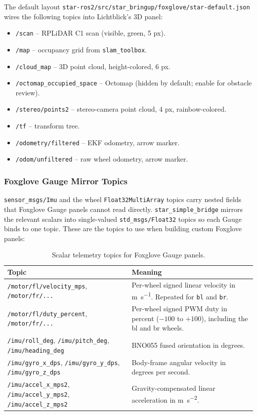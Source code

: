 \documentclass[11pt,letterpaper]{article}
\begin{document}
The default layout
\texttt{star-ros2/src/star\_bringup/foxglove/star-default.json}
wires the following topics into Lichtblick's 3D panel:
\begin{itemize}[leftmargin=1.4em,itemsep=2pt]
\item \texttt{/scan} -- RPLiDAR C1 scan (visible, green, 5 px).
\item \texttt{/map} -- occupancy grid from \texttt{slam\_toolbox}.
\item \texttt{/cloud\_map} -- 3D point cloud, height-colored, 6 px.
\item \texttt{/octomap\_occupied\_space} -- Octomap (hidden by
      default; enable for obstacle review).
\item \texttt{/stereo/points2} -- stereo-camera point cloud, 4 px,
      rainbow-colored.
\item \texttt{/tf} -- transform tree.
\item \texttt{/odometry/filtered} -- EKF odometry, arrow marker.
\item \texttt{/odom/unfiltered} -- raw wheel odometry, arrow marker.
\end{itemize}

\subsubsection*{Foxglove Gauge Mirror Topics}
\texttt{sensor\_msgs/Imu} and the wheel \texttt{Float32MultiArray}
topics carry nested fields that Foxglove Gauge panels cannot read
directly. \texttt{star\_simple\_bridge} mirrors the relevant scalars
into single-valued \texttt{std\_msgs/Float32} topics so each Gauge
binds to one topic. These are the topics to use when building
custom Foxglove panels:
\begin{table}[H]
\centering
\caption{Scalar telemetry topics for Foxglove Gauge panels.}
\label{tab:foxglove-gauges}
\small
\begin{tabularx}{\linewidth}{l X}
\toprule
\textbf{Topic} & \textbf{Meaning} \\
\midrule
\texttt{/motor/fl/velocity\_mps}, \texttt{/motor/fr/...}
    & Per-wheel signed linear velocity in \unit{\meter\per\second}.
      Repeated for \texttt{bl} and \texttt{br}. \\
\texttt{/motor/fl/duty\_percent}, \texttt{/motor/fr/...}
    & Per-wheel signed PWM duty in percent (\(-100\) to \(+100\)),
      including the bl and br wheels. \\
\texttt{/imu/roll\_deg}, \texttt{/imu/pitch\_deg},
\texttt{/imu/heading\_deg}
    & BNO055 fused orientation in degrees. \\
\texttt{/imu/gyro\_x\_dps}, \texttt{/imu/gyro\_y\_dps},
\texttt{/imu/gyro\_z\_dps}
    & Body-frame angular velocity in degrees per second. \\
\texttt{/imu/accel\_x\_mps2}, \texttt{/imu/accel\_y\_mps2},
\texttt{/imu/accel\_z\_mps2}
    & Gravity-compensated linear acceleration in \unit{\meter\per\second\squared}. \\
\bottomrule
\end{tabularx}
\end{table}
\end{document}
